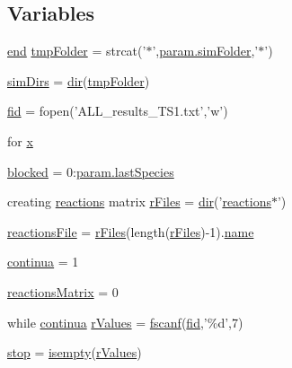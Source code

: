 \subsection*{Variables}
\begin{DoxyCompactItemize}
\item 
\hyperlink{a00019_afb358f48b1646c750fb9da6c6585be2b}{end} \hyperlink{a00023_ad509473eed851f9f5ff4157c02ec8618}{tmp\-Folder} = strcat('$\ast$',\hyperlink{a00026_aa671e3345005bd599e662bcaa115b18a}{param.\-sim\-Folder},'$\ast$')
\item 
\hyperlink{a00023_aae5035eb84b89176ed5b06e136325eff}{sim\-Dirs} = \hyperlink{a00065_a4ca269cf93df1b512b52174c1a256fe5}{dir}(\hyperlink{a00023_ad509473eed851f9f5ff4157c02ec8618}{tmp\-Folder})
\item 
\hyperlink{a00023_ae9011d40c6f13e68e6f07156e0da7c5d}{fid} = fopen('A\-L\-L\-\_\-results\-\_\-\-T\-S1.\-txt','w')
\item 
for \hyperlink{a00023_a7265972fe485274cfff77a9bb07b8fce}{x}
\item 
\hyperlink{a00023_a1faaaae288fc8ca4ed1751049aa2f84f}{blocked} = 0\-:\hyperlink{a00026_aad7be196243f3c9ca83dfee7c9111014}{param.\-last\-Species}
\item 
creating \hyperlink{a00015}{reactions} matrix \hyperlink{a00023_ad75735665492cabd747370126464fddf}{r\-Files} = \hyperlink{a00065_a4ca269cf93df1b512b52174c1a256fe5}{dir}('\hyperlink{a00015}{reactions}$\ast$')
\item 
\hyperlink{a00023_a4c72dba1fe2ee2fbcc699262a8d0c624}{reactions\-File} = \hyperlink{a00024_ad75735665492cabd747370126464fddf}{r\-Files}(length(\hyperlink{a00024_ad75735665492cabd747370126464fddf}{r\-Files})-\/1).\hyperlink{a00021_abbf559a76fab59203496b0847ab9502a}{name}
\item 
\hyperlink{a00023_a9c951ebd5bc3f1adce943bee1255f4d6}{continua} = 1
\item 
\hyperlink{a00023_ac52097a2745fcef31eb175d2e9485845}{reactions\-Matrix} = 0
\item 
while \hyperlink{a00024_a9c951ebd5bc3f1adce943bee1255f4d6}{continua} \hyperlink{a00023_a436a6968124e560649654a4abbd9dac6}{r\-Values} = \hyperlink{a00019_a028ac102a731e62fb0a7439381f566c1}{fscanf}(\hyperlink{a00025_ae9011d40c6f13e68e6f07156e0da7c5d}{fid},'\%d',7)
\item 
\hyperlink{a00023_a6bd08e37edf4151f5f6d1fc27a6f227a}{stop} = \hyperlink{a00019_ac10445404f4b83302522defb59e25ef7}{isempty}(\hyperlink{a00024_a436a6968124e560649654a4abbd9dac6}{r\-Values})
\item 

\end{DoxyCompactItemize}
